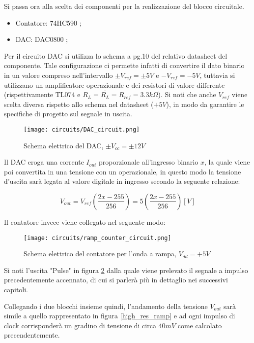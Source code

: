 
Si passa ora alla scelta dei componenti per la realizzazione del blocco circuitale.

\begin{itemize}
    \item Contatore: 74HC590 \cite{74hc590};
    \item DAC: DAC0800 \cite{dac0800};
\end{itemize}

Per il circuito DAC si utilizza lo schema a pg.10 del relativo datasheet del componente.
Tale configurazione ci permette infatti di convertire il dato binario in un valore compreso
nell'intervallo $\pm V_{ref}= \pm 5V$ e $-V_{ref}= -5V$, tuttavia si utilizzano un amplificatore
operazionale e dei resistori di valore differente (rispettivamente TL074 \cite{tl074} e
$R_L=\bar{R_L}=R_{ref}=3.3k\Omega$). Si noti che anche $V_{ref}$ viene scelta diversa rispetto
allo schema nel datasheet ($+5V$), in modo da garantire le specifiche di progetto sul segnale
in uscita.
\medskip

\begin{figure}[ht]
    \centering
    \texttt{[image: circuits/DAC\_circuit.png]}
    \caption{Schema elettrico del DAC, $\pm V_{cc}=\pm 12V$}
    \label{DAC_circuit}
\end{figure}

Il DAC eroga una corrente $I_{out}$ proporzionale all'ingresso binario $x$, la quale viene poi
convertita in una tensione con un operazionale, in questo modo la tensione d'uscita sarà
legata al valore digitale in ingresso secondo la seguente relazione:

$$V_{out}=V_{ref}\left(\frac{2x-255}{256}\right)=5\left(\frac{2x-255}{256}\right)[V]$$

Il contatore invece viene collegato nel seguente modo:
\medskip

\begin{figure}[ht]
    \centering
    \texttt{[image: circuits/ramp\_counter\_circuit.png]}
    \caption{Schema elettrico del contatore per l'onda a rampa, $V_{dd}=+5V$}
    \label{ramp_counter_circuit}
\end{figure}

Si noti l'uscita "Pulse" in figura \ref{ramp_counter_circuit} dalla quale viene prelevato
il segnale a impulso precedentemente accennato, di cui si parlerà più in dettaglio nei
successivi capitoli.

Collegando i due blocchi insieme quindi, l'andamento della tensione $V_{out}$ sarà simile a
quello rappresentato in figura \ref{high_res_ramp} e ad ogni impulso di clock corrisponderà
un gradino di tensione di circa $40mV$ come calcolato precendentemente.

